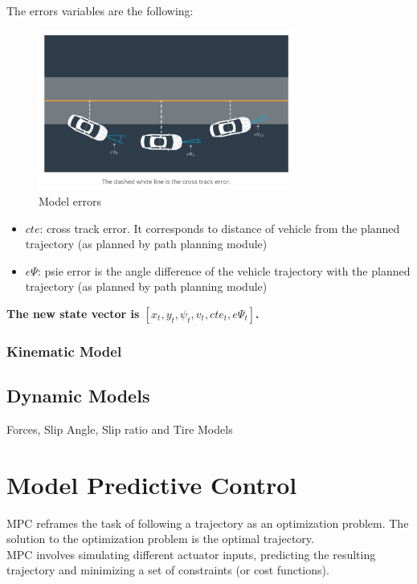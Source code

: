 \documentclass[11pt]{article}
\begin{document}
The errors variables are the following:
\begin{figure}[h]
    \centering
    \includegraphics[width=0.75\textwidth]{errors}
    \caption{Model errors}
    \label{fig:errors}
\end{figure}
\FloatBarrier

\begin{itemize}
\item $cte$: cross track error. It corresponds to distance of vehicle from the planned trajectory (as planned by path planning module)
\item $e\Psi$: psie error is the angle difference of the vehicle trajectory with the planned trajectory (as planned by path planning module)
\end{itemize}

\textbf{The new state vector is $[x_t, y_t, \psi_t, v_t, cte_t, e\Psi_t]$.
}
\subsubsection{Kinematic Model}


\subsection{Dynamic Models}


Forces, Slip Angle, Slip ratio and Tire Models


\section{Model Predictive Control}

MPC reframes the task of following a trajectory as an optimization problem. The solution to the optimization problem is the optimal trajectory. \\

MPC involves simulating different actuator inputs, predicting the resulting trajectory and minimizing a set of constraints (or cost functions). \\ 
\end{document}
